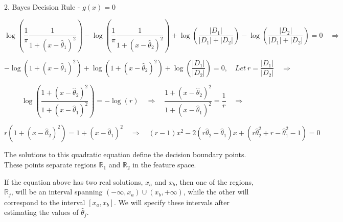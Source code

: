 \documentclass[aspectratio=169,xcolor=dvipsnames]{beamer}
\begin{document}

\begin{frame}{2. Bayes Decision Rule - $g(x) = 0$}

    \vspace{-15pt}

    $$ \log(\frac{1}{\pi}\frac{1}{1 + (x - \hat{\theta}_1)^2}) - \log(\frac{1}{\pi}\frac{1}{1 + (x - \hat{\theta}_2)^2}) + \log(\frac{|D_1|}{|D_1| + |D_2|}) - \log(\frac{|D_2|}{|D_1| + |D_2|}) = 0 \quad \Rightarrow$$

    \vspace{-5pt}

    $$ -\log(1 + (x - \hat{\theta}_1)^2) + \log(1 + (x - \hat{\theta}_2)^2) + \log(\frac{|D_1|}{|D_2|}) = 0, \quad Let\ r = \frac{|D_1|}{|D_2|} \quad \Rightarrow$$

    \vspace{-5pt}
    
    $$ \log(\frac{1 + (x - \hat{\theta}_2)^2}{1 + (x - \hat{\theta}_1)^2}) = -\log(r) \quad \Rightarrow \quad \frac{1 + (x - \hat{\theta}_2)^2}{1 + (x - \hat{\theta}_1)^2} = \frac{1}{r} \quad \Rightarrow$$

    \vspace{-5pt}
    
    $$ r(1 + (x - \hat{\theta}_2)^2) = 1 + (x - \hat{\theta}_1)^2 \quad \Rightarrow \quad (r-1)x^2 - 2(r\hat{\theta}_2 - \hat{\theta}_1)x + (r\hat{\theta}_2^2 + r - \hat{\theta}_1^2 - 1) = 0 $$
    
    The solutions to this quadratic equation define the decision boundary points. These points separate regions $\mathbb{R}_1$ and $\mathbb{R}_2$ in the feature space. 
    
    If the equation above has two real solutions, $x_a$ and $x_b$, then one of the regions, $\mathbb{R}_j$, will be an interval spanning $(-\infty, x_a) \cup (x_b, +\infty)$, while the other will correspond to the interval $[x_a, x_b]$. We will specify these intervals after estimating the values of $\hat{\theta}_j$.
    
\end{frame}

\end{document}
